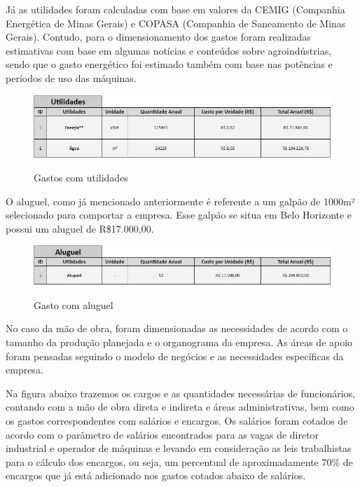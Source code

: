 \documentclass[
	12pt,				%
	openright,			%
	oneside,			%
	a4paper,			%
	english,			%
	french,				%
	spanish,			%
	brazil				%
	]{abntex2}
\begin{document}
Já as utilidades foram calculadas com base em valores da CEMIG (Companhia Energética de Minas Gerais) e COPASA (Companhia de Saneamento de Minas Gerais). Contudo, para o dimensionamento dos gastos foram realizadas estimativas com base em algumas notícias e conteúdos sobre agroindústrias, sendo que o gasto energético foi estimado também com base nas potências e períodos de uso das máquinas. \cite{ene} \cite{agua}


\begin{figure}[H]
\begin{center}
\caption{Gastos com utilidades}
\includegraphics[scale=0.55]{2.jpeg} 
\label{-}
\end{center}
\end{figure}

O aluguel, como já mencionado anteriormente é referente a um galpão de 1000m² selecionado para comportar a empresa. Esse galpão se situa em Belo Horizonte e possui um aluguel de R\$17.000,00. \cite{galpao}

\begin{figure}[H]
\begin{center}
\caption{Gasto com aluguel}
\includegraphics[scale=0.55]{3.jpeg} 
\label{-}
\end{center}
\end{figure}

No caso da mão de obra, foram dimensionadas as necessidades de acordo com o tamanho da produção planejada e o organograma da empresa. As áreas de apoio foram pensadas seguindo o modelo de negócios e as necessidades específicas da empresa.

Na figura abaixo trazemos os cargos e as quantidades necessárias de funcionários, contando com a mão de obra direta e indireta e áreas administrativas, bem como os gastos correspondentes com salários e encargos. Os salários foram cotados de acordo com o parâmetro de salários encontrados para as vagas de diretor industrial e operador de máquinas e levando em consideração as leis trabalhistas para o cálculo dos encargos, ou seja, um percentual de aproximadamente 70$\%$ de encargos que já está adicionado nos gastos cotados abaixo de salários. \cite{sala1} \cite{sala2} \cite{encargos}
\end{document}
